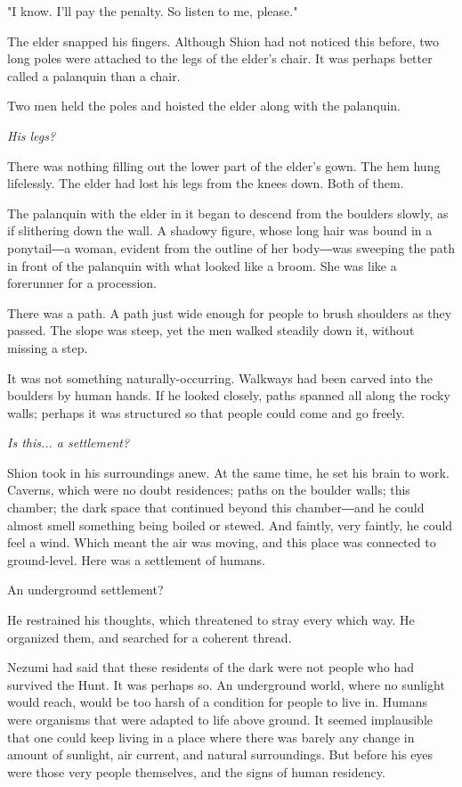 "I know. I'll pay the penalty. So listen to me, please."

The elder snapped his fingers. Although Shion had not noticed this
before, two long poles were attached to the legs of the elder's chair.
It was perhaps better called a palanquin than a chair.

Two men held the poles and hoisted the elder along with the palanquin.

\emph{His legs?}

There was nothing filling out the lower part of the elder's gown. The
hem hung lifelessly. The elder had lost his legs from the knees down.
Both of them.

The palanquin with the elder in it began to descend from the boulders
slowly, as if slithering down the wall. A shadowy figure, whose long
hair was bound in a ponytail―a woman, evident from the outline of her
body―was sweeping the path in front of the palanquin with what looked
like a broom. She was like a forerunner for a procession.

There was a path. A path just wide enough for people to brush shoulders
as they passed. The slope was steep, yet the men walked steadily down
it, without missing a step.

It was not something naturally-occurring. Walkways had been carved into
the boulders by human hands. If he looked closely, paths spanned all
along the rocky walls; perhaps it was structured so that people could
come and go freely.

\emph{Is this... a settlement?}

Shion took in his surroundings anew. At the same time, he set his brain
to work. Caverns, which were no doubt residences; paths on the boulder
walls; this chamber; the dark space that continued beyond this
chamber―and he could almost smell something being boiled or stewed. And
faintly, very faintly, he could feel a wind. Which meant the air was
moving, and this place was connected to ground-level. Here was a
settlement of humans.

An underground settlement?

He restrained his thoughts, which threatened to stray every which way.
He organized them, and searched for a coherent thread.

Nezumi had said that these residents of the dark were not people who had
survived the Hunt. It was perhaps so. An underground world, where no
sunlight would reach, would be too harsh of a condition for people to
live in. Humans were organisms that were adapted to life above ground.
It seemed implausible that one could keep living in a place where there
was barely any change in amount of sunlight, air current, and natural
surroundings. But before his eyes were those very people themselves, and
the signs of human residency.

